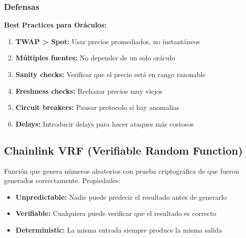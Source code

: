 \documentclass[11pt,a4paper,twoside]{book}
\begin{document}
\subsubsection{Defensas}

\begin{keyidea}
\textbf{Best Practices para Or\'aculos:}
\begin{enumerate}
    \item \textbf{TWAP > Spot:} Usar precios promediados, no instant\'aneos
    \item \textbf{M\'ultiples fuentes:} No depender de un solo or\'aculo
    \item \textbf{Sanity checks:} Verificar que el precio est\'a en rango razonable
    \item \textbf{Freshness checks:} Rechazar precios muy viejos
    \item \textbf{Circuit breakers:} Pausar protocolo si hay anomal\'ias
    \item \textbf{Delays:} Introducir delays para hacer ataques m\'as costosos
\end{enumerate}
\end{keyidea}

\subsection{Chainlink VRF (Verifiable Random Function)}

\begin{definition}[VRF]
Funci\'on que genera n\'umeros aleatorios con prueba criptogr\'afica de que fueron generados correctamente. Propiedades:
\begin{itemize}
    \item \textbf{Unpredictable:} Nadie puede predecir el resultado antes de generarlo
    \item \textbf{Verifiable:} Cualquiera puede verificar que el resultado es correcto
    \item \textbf{Deterministic:} La misma entrada siempre produce la misma salida
\end{itemize}
\end{definition}
\end{document}
